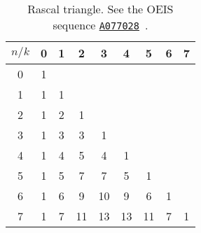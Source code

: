 ﻿\begin{table}[H]
    \begin{center}
        \setlength\extrarowheight{-6pt}
        \begin{tabular}{c|cccccccc}
            $n/k$ & 0 & 1 & 2  & 3  & 4  & 5  & 6 & 7 \\
            \hline
            0     & 1 &   &    &    &    &    &   &   \\
            1     & 1 & 1 &    &    &    &    &   &   \\
            2     & 1 & 2 & 1  &    &    &    &   &   \\
            3     & 1 & 3 & 3  & 1  &    &    &   &   \\
            4     & 1 & 4 & 5  & 4  & 1  &    &   &   \\
            5     & 1 & 5 & 7  & 7  & 5  & 1  &   &   \\
            6     & 1 & 6 & 9  & 10 & 9  & 6  & 1 &   \\
            7     & 1 & 7 & 11 & 13 & 13 & 11 & 7 & 1
        \end{tabular}
    \end{center}
    \caption{Rascal triangle. See the OEIS sequence \href{https://oeis.org/A077028}{\texttt{A077028}}~\cite{sloane2002rascal}.}
    \label{tab:rascal-triangle-i-1}
\end{table}
